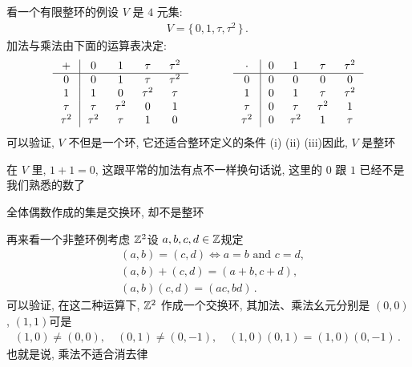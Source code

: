 \begin{example}
    看一个有限整环的例\period 设 $V$  是 $4$ 元集:
    \begin{align*}
        V = \{\, 0,1,\tau,\tau^2 \,\}\period
    \end{align*}
    加法与乘法由下面的运算表决定:
    \begin{align*}
        \arraycolsep=0.25cm
        \begin{array}{c|cccc}
            +      & 0      & 1      & \tau   & \tau^2 \\ \hline
            0      & 0      & 1      & \tau   & \tau^2 \\
            1      & 1      & 0      & \tau^2 & \tau   \\
            \tau   & \tau   & \tau^2 & 0      & 1      \\
            \tau^2 & \tau^2 & \tau   & 1      & 0      \\
        \end{array}
        \qquad \qquad
        \begin{array}{c|cccc}
            \cdot  & 0 & 1      & \tau   & \tau^2 \\ \hline
            0      & 0 & 0      & 0      & 0      \\
            1      & 0 & 1      & \tau   & \tau^2 \\
            \tau   & 0 & \tau   & \tau^2 & 1      \\
            \tau^2 & 0 & \tau^2 & 1      & \tau   \\
        \end{array}
    \end{align*}
    可以验证, $V$ 不但是一个环, 它还适合整环定义的条件 (i) (ii) (iii)\period 因此, $V$ 是整环\period

    在 $V$ 里, $1+1=0$, 这跟平常的加法有点不一样\period 换句话说, 这里的 $0$ 跟 $1$ 已经不是我们熟悉的数了\period
\end{example}

\begin{example}
    全体偶数作成的集是交换环, 却不是整环\period
\end{example}

\begin{example}
    再来看一个非整环例\period 考虑 $\mathbb{Z}^2$\period 设 $a,b,c,d \in \mathbb{Z}$\period 规定
    \begin{align*}
         & (a,b) = (c,d) \iff a = b \text{ and } c = d, \\
         & (a,b) + (c,d) = (a+b,c+d),                   \\
         & (a,b)(c,d) = (ac,bd)\period
    \end{align*}
    可以验证, 在这二种运算下, $\mathbb{Z}^2$ 作成一个交换环, 其加法、乘法幺元分别是 $(0,0)$, $(1,1)$\period 可是
    \begin{align*}
        (1,0) \neq (0,0), \quad (0,1) \neq (0,-1), \quad (1,0)(0,1) = (1,0)(0,-1) \period
    \end{align*}
    也就是说, 乘法不适合消去律\period
\end{example}

